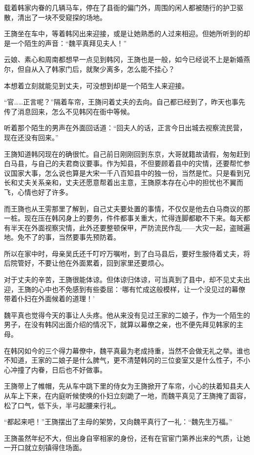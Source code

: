 载着韩家内眷的几辆马车，停在了县衙的偏门外，周围的闲人都被随行的护卫驱散，清出了一块不受窥探的场地。

王旖坐在车中，等着韩冈出来迎接，或是让她熟悉的人过来相迎。但她所听到的却是一个陌生的声音：“魏平真拜见夫人！”

云娘、素心和周南都想早一点见到韩冈，王旖也是一般，如今已经说不上是新婚燕尔，但自从入了韩家门后，就聚少离多，怎么能不挂心？

本想着立刻就能见到丈夫，可没想到却是一个陌生人来迎接。

“官……正言呢？”隔着车帘，王旖问着丈夫的去向。自己都已经到了，昨天也事先传了消息回来，怎么不见韩冈在衙中等候。

听着那个陌生的男声在外面回话道：“回夫人的话，正言今日出城去视察流民营，现在还没有回来。”

王旖知道韩冈现在的确很忙。自己前日刚刚回到东京，大哥就籍故请假，匆匆赶到白马县，与自己的夫君商议要事。作为知县，不但要顾着县中的灾情，还要帮忙参议国家大事，怎么说也算是大宋一千八百知县中的独一份，当然是忙。只是看到兄长和丈夫关系亲和，丈夫还愿意帮着出主意，王旖原本存在心中的担忧也不翼而飞，心情也好了许多。

而王旖也从王雱那里了解到，自己丈夫要处置的事情，不仅仅是他去白马商议的那一桩。现在压在韩冈身上的要务，件件都事关重大，忙得连脚都歇不下来。每天都有半天在外面视察灾情，此外还要整顿保甲，严防流民作乱——大灾一起，盗贼遍地。免不了的事，当然要事先预防着。

所以在家中时，母亲吴氏还千叮咛万嘱咐，到了白马县后，要好生服侍着丈夫，将后院管好，不要让他在外面累着，回到家里还要烦心。

对于丈夫的辛苦，王旖很能体谅。但体谅归体谅，可当真到了县中，却不见丈夫出迎，王旖的心中也不免感到有些委屈：‘哪有忙成这般模样，让一个没见过的幕僚带着仆妇在外面候着的道理！’

魏平真也觉得今天的事让人头疼。他从来没有见过王家的二娘子，作为一个陌生的男子，在没有韩冈出面介绍的情况下，就算以幕僚之亲，也不便先拜见韩家的主母。

在韩冈如今的三个得力幕僚中，魏平真最为老成持重，当然不会做无礼之举。谁也不知道，王家的二娘子是什么脾气，更不清楚韩冈的三位妾室又是什么性子，不小心冲撞了内眷，日后也不好做事。

王旖带上了帷帽，先从车中跳下里的侍女为王旖掀开了车帘，小心的扶着知县夫人从车上下来，在内庭听候使唤的仆妇立刻跪了一地，而魏平真见了王旖掩了面容，松了口气，低下头，半弓起腰来行礼。

“都起来吧！”王旖摆出了主母的架势，又向魏平真行了一礼：“魏先生万福。”

王旖虽然年纪不大，但出身自宰相家的身份，还有在官宦门第养出来的气质，让她一开口就立刻镇得住场面。

